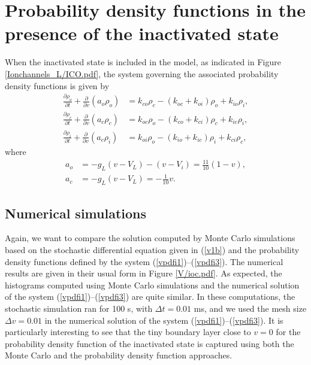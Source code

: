 


\section{Probability density functions in the presence of the inactivated
state \label{pdfi}}

When the inactivated state is included in the model, as indicated in Figure  \ref{Ionchannels_L/ICO.pdf},
 the system governing the associated probability density functions is given by%
\begin{align}
\frac{\partial\rho_{o}}{\partial t}+\frac{\partial}{\partial v}\left(
a_{o}\rho_{o}\right)   &  =k_{co}\rho_{c}-(k_{oc}+k_{oi})\rho_{o}+k_{io}%
\rho_{i},\label{vpdfi1}\\
\frac{\partial\rho_{c}}{\partial t}+\frac{\partial}{\partial v}\left(
a_{c}\rho_{c}\right)   &  =k_{oc}\rho_{o}-(k_{co}+k_{ci})\rho_{c}+k_{ic}%
\rho_{i},\label{vpdfi2}\\
\frac{\partial\rho_{i}}{\partial t}+\frac{\partial}{\partial v}\left(
a_{c}\rho_{i}\right)   &  =k_{oi}\rho_{o}-(k_{io}+k_{ic})\rho_{i}+k_{ci}%
\rho_{c}\label{vpdfi3},
\end{align}
where
\begin{align}
a_{o}  &  =-g_{L}\left(  v-V_{L}\right)  -(v-V_{i})=\frac{11}{10}\left(
1-v\right)  ,\label{vfluxi}\\
a_{c}  &  =-g_{L}\left(  v-V_{L}\right)  =-\frac{1}{10}v.\nonumber
\end{align}


\subsection{Numerical simulations}
Again, we want to compare the solution computed by Monte Carlo simulations based on the stochastic
differential equation given in (\ref{v1b}) and the probability density functions defined by the system  (\ref{vpdfi1})--(\ref{vpdfi3}).
The numerical results are given in their usual form in Figure \ref{V/ioc.pdf}. 
As expected, the histograms computed using Monte Carlo simulations
and the numerical solution of the system  (\ref{vpdfi1})--(\ref{vpdfi3}) are quite similar. In these computations, 
the stochastic simulation ran for 100 s, with $\Delta t=0.01$ ms, and we used the mesh size $\Delta v=0.01$ in the numerical solution of the system  (\ref{vpdfi1})--(\ref{vpdfi3}). It is particularly interesting to
see that the tiny boundary layer close to $v=0$ for the probability density function of the inactivated state is captured using both the Monte Carlo and the probability density function approaches.


